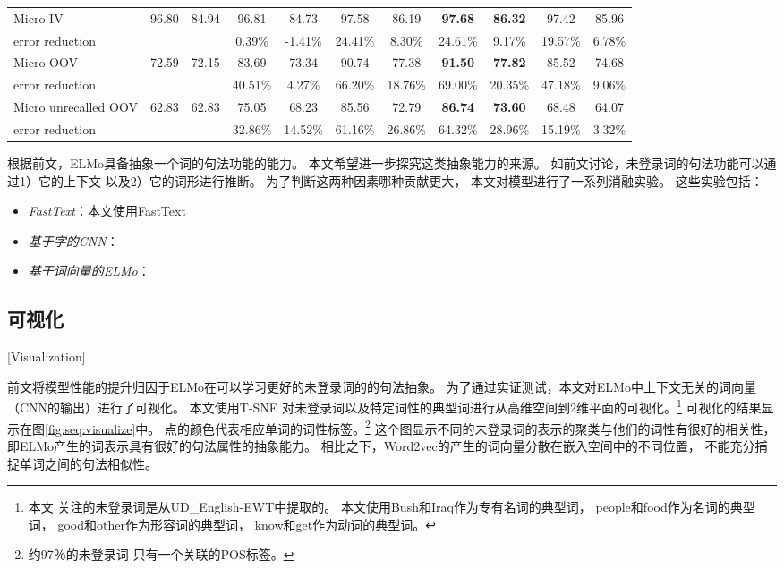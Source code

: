 \begin{table}[t]
\begin{tabular}{p{2.8cm} | cc cc cc | cc cc}
		\hline
		\hline
		Micro IV & 96.80 & 84.94 & 96.81 & 84.73 & 97.58 & 86.19 & \bf 97.68 & \bf 86.32 & 97.42  & 85.96 \\
		\quad error reduction & & & 0.39\% & -1.41\%& 24.41\% & 8.30\% & 24.61\% & 9.17\% & 19.57\% & 6.78\% \\
		Micro OOV & 72.59 & 72.15 & 83.69 & 73.34 & 90.74 & 77.38 & \bf 91.50 & \bf 77.82  & 85.52 & 74.68 \\
		\quad error reduction & & & 40.51\% & 4.27\% & 66.20\% & 18.76\% & 69.00\% & 20.35\% & 47.18\% & 9.06\% \\
		Micro unrecalled OOV & 62.83 & 62.83 & 75.05 & 68.23 & 85.56 & 72.79 &\bf 86.74 &\bf 73.60 & 68.48 & 64.07 \\
		\quad error reduction & &  & 32.86\% & 14.52\% & 61.16\% & 26.86\% & 64.32\% & 28.96\% & 15.19\% & 3.32\% \\
		\hline
	\end{tabular}
\end{table}

根据前文，ELMo具备抽象一个词的句法功能的能力。
本文希望进一步探究这类抽象能力的来源。
如前文讨论，未登录词的句法功能可以通过1）它的上下文
以及2）它的词形进行推断。
为了判断这两种因素哪种贡献更大，
本文对模型进行了一系列消融实验。
这些实验包括：
\begin{itemize}
	\item \textit{FastText}：本文使用FastText\cite{Q17-1010}
	\item \textit{基于字的CNN}：
	\item \textit{基于词向量的ELMo}：
\end{itemize}

\subsection{可视化}[Visualization]
\begin{table*}
	\centering
	\footnotesize
	\caption{The comparison with baselines using different inputs.
	}\label{tbl:ablation}
	
\end{table*}

前文将模型性能的提升归因于ELMo在可以学习更好的未登录词的的句法抽象。
为了通过实证测试，本文对ELMo中上下文无关的词向量（CNN的输出）进行了可视化。
本文使用T-SNE \cite{maaten2008visualizing}对未登录词以及特定词性的典型词进行从高维空间到2维平面的可视化。\footnote{本文
	关注的未登录词是从{UD\_English-EWT}中提取的。
	本文使用{Bush}和{Iraq}作为专有名词的典型词，
	{people}和{food}作为名词的典型词，
	{good}和{other}作为形容词的典型词，
	{know}和{get}作为动词的典型词。}
可视化的结果显示在图\ref{fig:seq:visualize}中。
点的颜色代表相应单词的词性标签。\footnote {约97％的未登录词
	只有一个关联的POS标签。}
这个图显示不同的未登录词的表示的聚类与他们的词性有很好的相关性，
即ELMo产生的词表示具有很好的句法属性的抽象能力。
相比之下，Word2vec的产生的词向量分散在嵌入空间中的不同位置，
不能充分捕捉单词之间的句法相似性。

